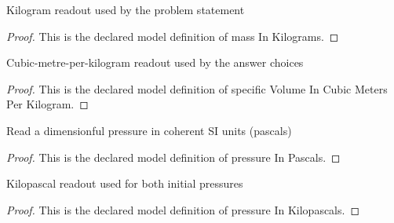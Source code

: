 \begin{definition}
  \label{def:physics:phyx-mini-0397:phyxminiproblems-problemphyxmini0397-massinkilograms}
  Kilogram readout used by the problem statement
\end{definition}
\begin{proof}
  This is the declared model definition of mass In Kilograms.
\end{proof}
\begin{definition}
  \label{def:physics:phyx-mini-0397:phyxminiproblems-problemphyxmini0397-specificvolumeincubicmetersperkilogram}
  Cubic-metre-per-kilogram readout used by the answer choices
\end{definition}
\begin{proof}
  This is the declared model definition of specific Volume In Cubic Meters Per Kilogram.
\end{proof}
\begin{definition}
  \label{def:physics:phyx-mini-0397:phyxminiproblems-problemphyxmini0397-pressureinpascals}
  Read a dimensionful pressure in coherent SI units (pascals)
\end{definition}
\begin{proof}
  This is the declared model definition of pressure In Pascals.
\end{proof}
\begin{definition}
  \label{def:physics:phyx-mini-0397:phyxminiproblems-problemphyxmini0397-pressureinkilopascals}
  Kilopascal readout used for both initial pressures
\end{definition}
\begin{proof}
  This is the declared model definition of pressure In Kilopascals.
\end{proof}
